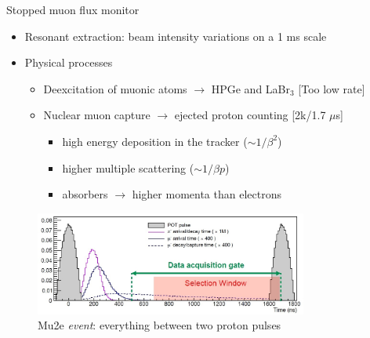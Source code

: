 \documentclass[10pt]{beamer}
\begin{document}
\begin{frame}{Stopped muon flux monitor}
\begin{itemize}
\item Resonant extraction: beam intensity variations on a 1 ms scale
\item Physical processes
\begin{itemize}
\item Deexcitation of muonic atoms $\rightarrow$ HPGe and LaBr$_3$ \hfill [Too low rate]
\item Nuclear muon capture $\rightarrow$ ejected proton counting \hfill [2k/1.7 $\mu$s]
\begin{itemize}
\item high energy deposition in the tracker ($\sim 1/\beta^2$) 
\item higher multiple scattering ($\sim 1/\beta p$)
\item absorbers $\rightarrow$ higher momenta than electrons
\end{itemize}
\end{itemize}
\end{itemize}   
\begin{figure}
\includegraphics[width=0.8\textwidth]{mu2e_event}
\caption{Mu2e \textit{event}: everything between two proton pulses}
\end{figure} 
\end{frame}
\end{document}
